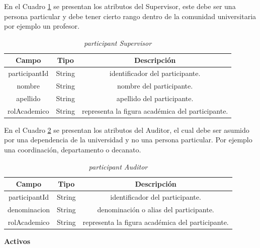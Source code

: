 En el Cuadro \ref{tabla:supervisor} se presentan los atributos del Supervisor, este debe ser una persona particular y debe tener cierto rango dentro de la comunidad universitaria por ejemplo un profesor.

\begin{table}[H]
    \caption{\textit{participant Supervisor}}
    \centering
     \begin{tabular}{ |c|c|c| }
        \hline
        \textbf{Campo} & \textbf{Tipo} & \textbf{Descripción} \\
             \hline
             participantId & String     & identificador del participante.\\
             nombre        & String     & nombre  del participante. \\
             apellido      & String     & apellido del participante.\\
             rolAcademico & String & representa la figura académica del participante.\\
             \hline
        \end{tabular}
    \label{tabla:supervisor}
\end{table}

En el Cuadro \ref{tabla:auditor} se presentan los atributos del Auditor, el cual debe ser asumido por  una dependencia de la universidad y no una persona particular. Por ejemplo una coordinación, departamento o decanato.

\begin{table}[H]
    \caption{\textit{participant Auditor}}
    \centering
    \begin{tabular}{ |c |c |c| }
        \hline
        \textbf{Campo} & \textbf{Tipo} & \textbf{Descripción} \\
             \hline
             participantId & String     & identificador del participante.\\
             denominacion        & String     & denominación o alias del participante. \\
             rolAcademico & String & representa la figura académica del participante.\\
             \hline
        \end{tabular}
    \label{tabla:auditor}
\end{table}



\textbf{Activos}

